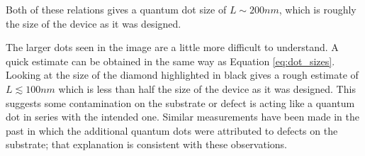 Both of these relations gives a quantum dot size of $L\sim200nm$, which is roughly the size of the device as it was designed. 

The larger dots seen in the image are a little more difficult to understand. A quick estimate can be obtained in the same way as Equation \ref{eq:dot_sizes}. Looking at the size of the diamond highlighted in black gives a rough estimate of $L \lesssim 100nm$ which is less than half the size of the device as it was designed. This suggests some contamination on the substrate or defect is acting like a quantum dot in series with the intended one. Similar measurements have been made in the past \cite{Stokes2010, McEuen1999, Park2001, Babi2003} in which the additional quantum dots were attributed to defects on the substrate; that explanation is consistent with these observations.